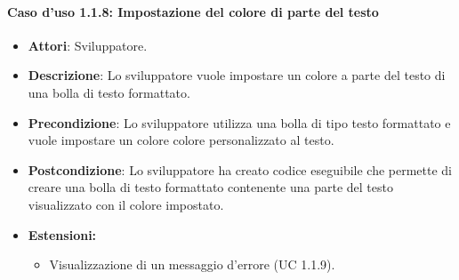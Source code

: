 \paragraph{Caso d'uso 1.1.8: Impostazione del colore di parte del testo}
\begin{itemize}
\item\textbf{Attori}: Sviluppatore.
\item\textbf{Descrizione}: Lo sviluppatore vuole impostare un colore a parte del testo di una bolla di testo formattato.
\item\textbf{Precondizione}: Lo sviluppatore utilizza una bolla di tipo testo formattato e vuole impostare un colore colore personalizzato al testo.
\item\textbf{Postcondizione}: Lo sviluppatore ha creato codice eseguibile che permette di creare una bolla di testo formattato contenente una parte del testo visualizzato con il colore impostato.
\item\textbf{Estensioni:}
	\begin{itemize}
		\item Visualizzazione di un messaggio d'errore (UC 1.1.9).
		\end{itemize}

\end{itemize}